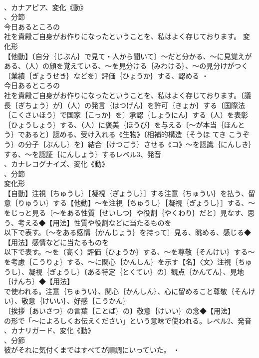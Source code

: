 \documentclass[8pt]{extreport}
\begin{document}
\begin{CJK}{UTF8}{min}
\\	、カナアピア、変化《動》
\\	、分節
\\	今日あるところの
\\	社を貴殿ご自身がお作りになったということを、私はよく存じております。	変化形 
\\	【他動】〔自分｛じぶん｝で見て・人から聞いて〕～だと分かる、～に見覚えがある、（人）の顔を覚えている、～を見分ける｛みわける｝、～の見分けがつく〔業績｛ぎょうせき｝などを〕評価｛ひょうか｝する、認める ・
\\	今日あるところの
\\	社を貴殿ご自身がお作りになったということを、私はよく存じております。〔議長｛ぎちょう｝が〕（人）の発言｛はつげん｝を許可｛きょか｝する〔国際法｛こくさいほう｝で国家｛こっか｝を〕承認｛しょうにん｝する（人）を表彰｛ひょうしょう｝する、（人）に褒美｛ほうび｝を与える〔～が本当｛ほんとう｝であると〕認める、受け入れる《生物》〔相補的構造｛そうほ てき こうぞう｝の分子｛ぶんし｝を〕結合｛けつごう｝させる《コ》～を認識｛にんしき｝する、～を認証｛にんしょう｝するレベル3、発音
\\	、カナレコグナイズ、変化《動》
\\	、分節
\\	変化形 
\\	【自動】注視｛ちゅうし｝［凝視｛ぎょうし｝］する注意｛ちゅうい｝を払う、留意｛りゅうい｝する【他動】～を注視｛ちゅうし｝［凝視｛ぎょうし｝］する、～をじっと見る〔～をある性質｛せいしつ｝や役割｛やくわり｝だと〕見なす、思う、考える◆【用法】性質や役割などに当たるものを
\\	以下で表す。〔～をある感情｛かんじょう｝を持って〕見る、眺める、感じる◆【用法】感情などに当たるものを
\\	以下で表す。～を（高く）評価｛ひょうか｝する、～を尊敬｛そんけい｝する～を考慮｛こうりょ｝する、～に関心｛かんしん｝を示す【名】〈文〉注視｛ちゅうし｝、凝視｛ぎょうし｝〔ある特定｛とくてい｝の〕観点｛かんてん｝、見地｛けんち｝◆【用法】
\\	で使われる。注意｛ちゅうい｝、関心｛かんしん｝、心に留めること尊敬｛そんけい｝、敬意｛けいい｝、好感｛こうかん｝
\\	〔挨拶｛あいさつ｝の言葉｛ことば｝の〕敬意｛けいい｝の念◆【用法】
\\	の形で「～によろしくお伝えください」という意味で使われる。レベル2、発音
\\	、カナリガード、変化《動》
\\	、分節
\\	彼がそれに気付くまではすべてが順調にいっていた。 ・

\end{CJK}
\end{document}

